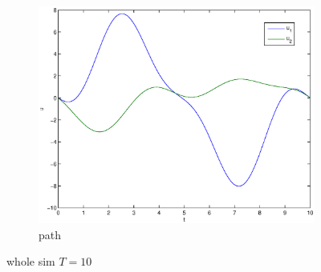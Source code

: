 \begin{figure}
\begin{subfigure}[b]{\textwidth}
\centering
\includegraphics[height=0.3\textheight]{img/final_15_1_10_u.eps}
\caption{path}
\end{subfigure}
\caption{whole sim $T=10$}
\end{figure}

